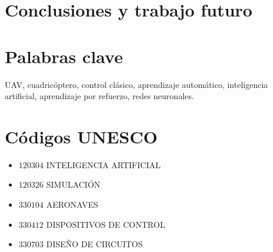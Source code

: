 \section*{Conclusiones y trabajo futuro}

\section*{Palabras clave}
UAV, cuadricóptero, control clásico, aprendizaje automático, inteligencia artificial, aprendizaje por refuerzo, redes neuronales.

\section*{Códigos UNESCO}
\begin{itemize}
	\item[] $120304$ \quad INTELIGENCIA ARTIFICIAL
	\item[] $120326$ \quad SIMULACIÓN
	\item[] $330104$ \quad AERONAVES
	\item[] $330412$ \quad DISPOSITIVOS DE CONTROL
	\item[] $330703$ \quad DISEÑO DE CIRCUITOS 

\end{itemize}
\newpage
\cleardoublepage